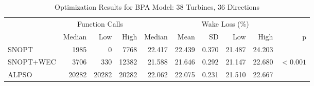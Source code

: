 \documentclass[a4paper]{jpconf}
\begin{document}
\begin{table}
	\centering
	\caption{Optimization Results for BPA Model: 38 Turbines, 36 Directions}
	\label{tab:case2}
	\begin{tabular}{lrrrrrrrrr}
		\toprule
		{} & \multicolumn{3}{c}{Function Calls} & \multicolumn{6}{c}{Wake Loss (\%)} \\
		\cmidrule(lr){2-4} \cmidrule(lr){5-10}
		{} &         Median &    Low &   High &        Median &   Mean &    SD &    Low &   High &          p \\
		\cmidrule(lr){2-4} \cmidrule(lr){5-10}
		SNOPT     &           1985 &      0 &   7768 &        22.417 & 22.439 & 0.370 & 21.487 & 24.203 &            \\
		SNOPT+WEC &           3706 &    330 &  12382 &        21.588 & 21.646 & 0.292 & 21.147 & 22.680 &  $< 0.001$ \\
		ALPSO     &          20282 &  20282 &  20282 &        22.062 & 22.075 & 0.231 & 21.510 & 22.667 &            \\
		\bottomrule
	\end{tabular}
\end{table}
%
%
%
\end{document}
